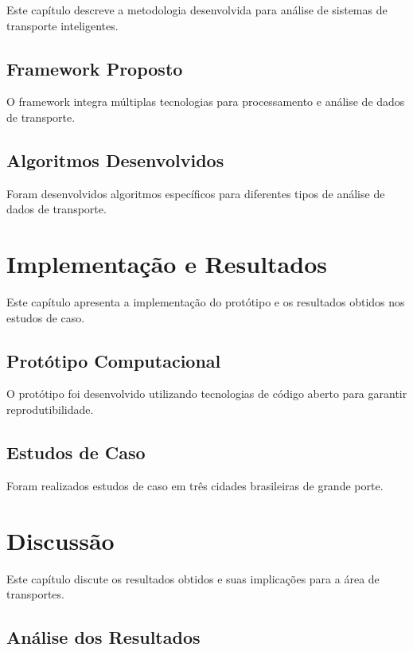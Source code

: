 \documentclass[doutorado,onehalfspacing,12pt,hyperref]{UnB-PPGT}
\begin{document}
Este capítulo descreve a metodologia desenvolvida para análise de sistemas de transporte inteligentes.

\section{Framework Proposto}
\label{sec:framework}

O framework integra múltiplas tecnologias para processamento e análise de dados de transporte.

\section{Algoritmos Desenvolvidos}
\label{sec:algoritmos}

Foram desenvolvidos algoritmos específicos para diferentes tipos de análise de dados de transporte.

\chapter{Implementação e Resultados}
\label{cap:resultados}

Este capítulo apresenta a implementação do protótipo e os resultados obtidos nos estudos de caso.

\section{Protótipo Computacional}
\label{sec:prototipo}

O protótipo foi desenvolvido utilizando tecnologias de código aberto para garantir reprodutibilidade.

\section{Estudos de Caso}
\label{sec:estudos}

Foram realizados estudos de caso em três cidades brasileiras de grande porte.

\chapter{Discussão}
\label{cap:discussao}

Este capítulo discute os resultados obtidos e suas implicações para a área de transportes.

\section{Análise dos Resultados}
\label{sec:analise}
\end{document}
